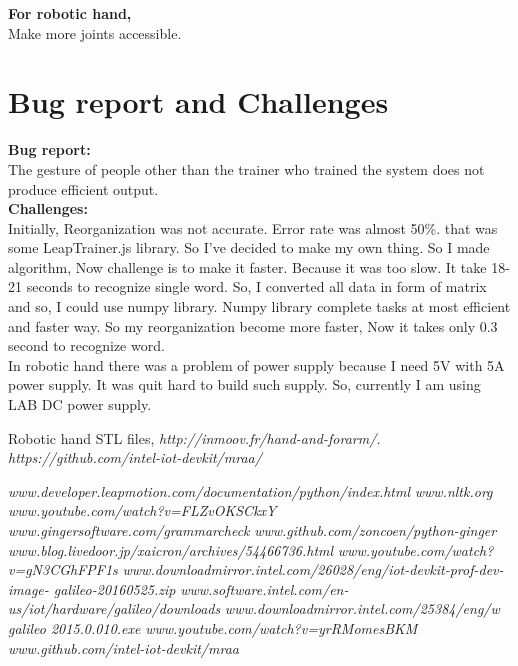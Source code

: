 \documentclass[a4paper,12pt,oneside]{book}
\begin{document}
\textbf{For robotic hand,}\\
Make more joints accessible.

\section{Bug report and Challenges}
\textbf{Bug report:}\\
The gesture of people other than the trainer who trained the system does not produce efficient output.\\
\textbf{Challenges:}\\
Initially, Reorganization was not accurate. Error rate was almost 50\%. that was some LeapTrainer.js library. So I've decided to make my own thing. So I made algorithm, Now challenge is to make it faster. Because it was too slow. It take 18-21 seconds to recognize single word. So, I converted all data in form of matrix and so, I could use numpy library. Numpy library complete tasks at most efficient and faster way. So my reorganization become more faster, Now it takes only 0.3 second to recognize word.\\
In robotic hand there was a problem of power supply because I need 5V with 5A power supply. It was quit hard to build such supply. So, currently I am using LAB DC power supply.

\begin{thebibliography}{li}
Robotic hand STL files,
{\em http://inmoov.fr/hand-and-forarm/.}
{\em https://github.com/intel-iot-devkit/mraa/}

{\em www.developer.leapmotion.com/documentation/python/index.html}
{\em www.nltk.org}
{\em www.youtube.com/watch?v=FLZvOKSCkxY}
{\em www.gingersoftware.com/grammarcheck}
{\em www.github.com/zoncoen/python-ginger}
{\em www.blog.livedoor.jp/xaicron/archives/54466736.html}
{\em www.youtube.com/watch?v=gN3CGhFPF1s}
{\em www.downloadmirror.intel.com/26028/eng/iot-devkit-prof-dev-image-
galileo-20160525.zip}
{\em www.software.intel.com/en-us/iot/hardware/galileo/downloads}
{\em www.downloadmirror.intel.com/25384/eng/w galileo 2015.0.010.exe}
{\em www.youtube.com/watch?v=yrRMomesBKM}
{\em www.github.com/intel-iot-devkit/mraa}
\end{thebibliography}
\end{document}
